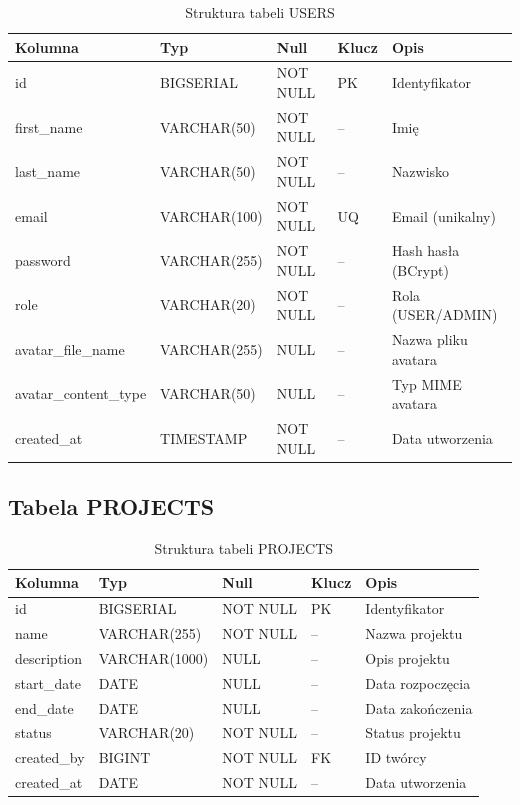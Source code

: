 \documentclass[12pt,a4paper]{report}
\begin{document}
\begin{table}[H]
\centering
\caption{Struktura tabeli USERS}
\begin{tabular}{|l|l|l|l|l|}
\hline
\textbf{Kolumna} & \textbf{Typ} & \textbf{Null} & \textbf{Klucz} & \textbf{Opis} \\
\hline
id & BIGSERIAL & NOT NULL & PK & Identyfikator \\
first\_name & VARCHAR(50) & NOT NULL & -- & Imię \\
last\_name & VARCHAR(50) & NOT NULL & -- & Nazwisko \\
email & VARCHAR(100) & NOT NULL & UQ & Email (unikalny) \\
password & VARCHAR(255) & NOT NULL & -- & Hash hasła (BCrypt) \\
role & VARCHAR(20) & NOT NULL & -- & Rola (USER/ADMIN) \\
avatar\_file\_name & VARCHAR(255) & NULL & -- & Nazwa pliku avatara \\
avatar\_content\_type & VARCHAR(50) & NULL & -- & Typ MIME avatara \\
created\_at & TIMESTAMP & NOT NULL & -- & Data utworzenia \\
\hline
\end{tabular}
\end{table}

\subsection{Tabela PROJECTS}

\begin{table}[H]
\centering
\caption{Struktura tabeli PROJECTS}
\begin{tabular}{|l|l|l|l|l|}
\hline
\textbf{Kolumna} & \textbf{Typ} & \textbf{Null} & \textbf{Klucz} & \textbf{Opis} \\
\hline
id & BIGSERIAL & NOT NULL & PK & Identyfikator \\
name & VARCHAR(255) & NOT NULL & -- & Nazwa projektu \\
description & VARCHAR(1000) & NULL & -- & Opis projektu \\
start\_date & DATE & NULL & -- & Data rozpoczęcia \\
end\_date & DATE & NULL & -- & Data zakończenia \\
status & VARCHAR(20) & NOT NULL & -- & Status projektu \\
created\_by & BIGINT & NOT NULL & FK & ID twórcy \\
created\_at & DATE & NOT NULL & -- & Data utworzenia \\
\hline
\end{tabular}
\end{table}
\end{document}
